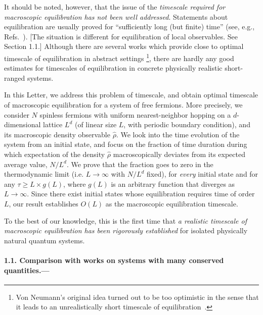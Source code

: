 \documentclass[aps,prl,superscriptaddress,reprint]{revtex4-2}
\newcommand{\se}[1]{\paragraph{#1.---}}
\theoremstyle{definition}
\renewcommand{\geq}{\geqslant}
\newcommand{\timescale}{timescale}
\begin{document}
It should be noted, however, that  the issue of the
\emph{{\timescale} required for macroscopic
equilibration has not been well addressed}.
Statements about equilibration are usually
proved for ``sufficiently long (but finite) time''
(see, e.g.,
Refs.~\cite{Tasaki1998-PhysRevLett.80.1373,Rigol2008Nature,Reimann2008-PhysRevLett.101.190403,Goldstein-Lebowitz-2010-PhysRevE.81.011109,Reimann_2012isol,ShiraishiTasaki2024JSP,RoosSTT2024,Tasaki2024freeexpansion}).
[The situation is different
for equilibration of local observables.
See Section 1.1.]
Although there are several works
\cite{GHT2013-PhysRevLett.111.140401,GHT2015,Malabarba-Linden-Short-2014-PhysRevE.90.012121}
which provide close to optimal {\timescale} of equilibration
in abstract settings
\footnote{
  Von Neumann's original idea turned out to be
  too optimistic in the sense that it
  leads to an unrealistically short {\timescale}
  of equilibration~\cite{GHT2015}.
},
there are hardly any good estimates
for {\timescale}s of equilibration
in concrete physically realistic short-ranged systems.

In this Letter,
we address this problem of {\timescale},
and obtain optimal {\timescale} of macroscopic equilibration for a system of free fermions.
More precisely, we consider $N$ spinless
fermions  with uniform nearest-neighbor hopping on a $d$-dimensional lattice $L^d$
(of linear size $L$, with periodic boundary condition), and its
macroscopic density observable $\hat\rho$.
We look into the time evolution of the system from an initial state, and
focus on the fraction of time duration during which expectation of the density
$\hat\rho$ macroscopically deviates from its expected average value, $N/L^d$.
We prove that the fraction goes to zero in the thermodynamic limit
(i.e.  $L \to \infty$ with $N/L^d$ fixed), for \emph{every} initial state
and for any $\tau \geq L \times g(L)$, where $g(L)$ is an arbitrary
function that diverges as $L \to \infty$.
Since there exist initial states whose equilibration requires time of order $L$,
our result establishes $O(L)$ as the macroscopic equilibration {\timescale}.

To the best of our knowledge, this is the first time that
\emph{a realistic {\timescale} of macroscopic equilibration has been rigorously established} for
isolated physically natural quantum systems.



\se{1.1. Comparison with works on systems with many conserved quantities}
\end{document}
